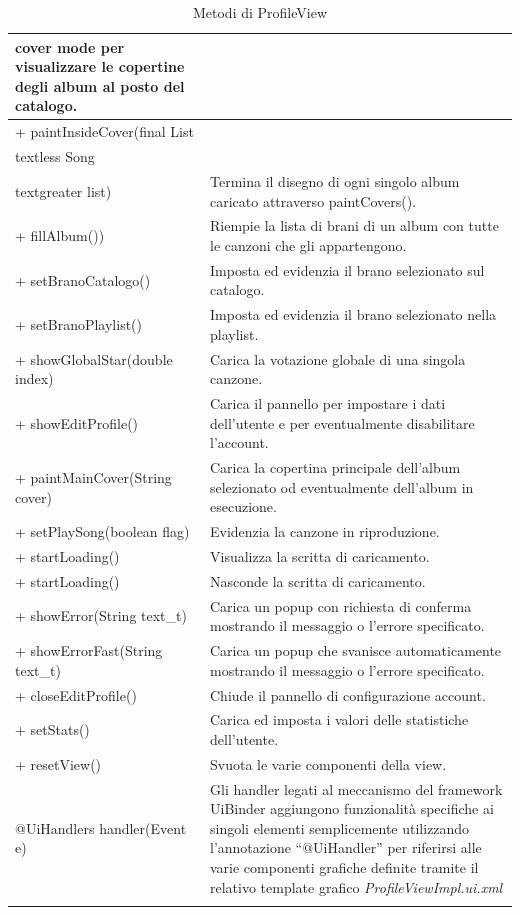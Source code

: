\begin{longtable}{|p{}|p{}|}
cover mode per visualizzare le copertine degli album al posto del
catalogo.\\\hline
+ paintInsideCover(final List\\textless Song\\textgreater list) &
Termina il disegno di ogni singolo album caricato attraverso
paintCovers().\\\hline
+ fillAlbum()) & Riempie la lista di brani di un album con tutte le canzoni che
gli appartengono. \\\hline
+ setBranoCatalogo() & Imposta ed evidenzia il brano selezionato sul catalogo.
\\\hline
+ setBranoPlaylist() & Imposta ed evidenzia il brano selezionato nella
playlist.\\\hline
+ showGlobalStar(double index) & Carica la votazione globale di una singola
canzone. \\\hline
+ showEditProfile() & Carica il pannello per impostare i dati
dell'utente e per eventualmente disabilitare l'account.\\\hline
+ paintMainCover(String cover) & Carica la copertina principale dell'album
selezionato od eventualmente dell'album in esecuzione.\\\hline
+ setPlaySong(boolean flag) & Evidenzia la canzone in riproduzione.\\\hline
+ startLoading() & Visualizza la scritta di caricamento.\\\hline
+ startLoading() & Nasconde la scritta di caricamento.\\\hline
+ showError(String text\_t) & Carica un popup con richiesta di conferma
mostrando il messaggio o l'errore specificato.\\\hline
+ showErrorFast(String text\_t) & Carica un popup che svanisce automaticamente
mostrando il messaggio o l'errore specificato.\\\hline
+ closeEditProfile() & Chiude il pannello di configurazione account.\\\hline
+ setStats() & Carica ed imposta i valori delle statistiche dell'utente.\\\hline
+ resetView() & Svuota le varie componenti della view.\\\hline
@UiHandlers handler(Event e) & Gli handler legati al meccanismo del framework
UiBinder aggiungono funzionalit\`a specifiche ai singoli elementi
semplicemente utilizzando l'annotazione ``@UiHandler'' per riferirsi alle varie
componenti grafiche definite tramite il relativo template grafico
\emph{ProfileViewImpl.ui.xml}\\\hline
\caption{Metodi di ProfileView}
\end{longtable}

